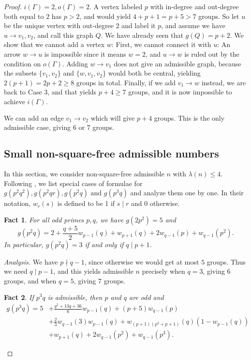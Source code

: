\documentclass[a4paper, 12pt]{article}
\theoremstyle{plain}
\newtheorem{eufact}{Fact}[section]
\theoremstyle{definition}
\begin{document}
\begin{proof}
 $i(\Gamma) = 2, o(\Gamma) = 2$. 
A vertex labeled $p$ with in-degree and out-degree both equal to $2$ has $p > 2$, and would yield $4 + p + 1 = p + 5 > 7$ groups. So let $u$ be the unique vertex with out-degree $2$ and label it $p$, and assume we have $u \rightarrow v_1, v_2$, and call this graph $Q$. We have already seen that $g(Q) = p + 2$. We show that we cannot add a vertex $w$: First, we cannot connect it with $u$: An arrow $w \rightarrow u$ is impossible since it means $w = 2$, and $u \rightarrow w$ is ruled out by the condition on $o(\Gamma)$. Adding $w \rightarrow v_1$ does not give an admissible graph, because the subsets $\{v_1, v_2\}$ and $\{w, v_1, v_2\}$ would both be central, yielding $2(p + 1) = 2p + 2 \ge 8$ groups in total. Finally, if we add $v_1 \rightarrow w$ instead, we are back to Case $3$, and that yields $p + 4 \ge 7$ groups, and it is now impossible to achieve $i(\Gamma)$.

We can add an edge $v_1 \rightarrow v_2$ which will give $p + 4$ groups. This is the only admissible case, giving $6$ or $7$ groups.

\subsection{Small non-square-free admissible numbers}
In this section, we consider non-square-free admissible $n$ with $\lambda(n) \le 4$. Following {\cite{bettinafour1}}, we list special cases of formulae for $g(p^2 q^2), g(p^2 q r), g(p^2 q) \text{ and } g(p^3 q)$ and analyze them one by one. In their notation, $w_r(s)$ is defined to be 1 if $s \mid r$ and 0 otherwise. 

\begin{eufact}
	For all odd primes $p, q$, we have $g(2p^2) = 5$ and \[g(p^2 q) = 2 + \frac{q + 5}{2} w_{p - 1}(q) + w_{p + 1}(q) + 2w_{q - 1}(p) + w_{q - 1}(p^2).\] In particular, $g(p^2 q) = 3$ if and only if $q \mid p + 1$.
\end{eufact}

\textit{Analysis.} We have $p \nmid q - 1$, since otherwise we would get at most $5$ groups. Thus we need $q \mid p - 1$, and this yields admissible $n$ precisely when $q = 3$, giving $6$ groups, and when $q = 5$, giving $7$ groups.

\begin{eufact}
	If $p^3 q$ is admissible, then $p$ and $q$ are odd and
	$$\begin{aligned}
		g(p^3 q) = 5 &+ \frac{q^2 + 13q + 36}{6} w_{p - 1}(q) + (p + 5) w_{q - 1}(p) \\
		&+ \frac{2}{3} w_{q - 1}(3)w_{p - 1}(q) + w_{(p + 1)(p^2 + p + 1)}(q) (1 - w_{p - 1}(q)) \\
		&+ w_{p + 1}(q) + 2 w_{q - 1}(p^2) + w_{q - 1}(p^3).
	\end{aligned}$$
\end{eufact}


\end{proof}
\end{document}
